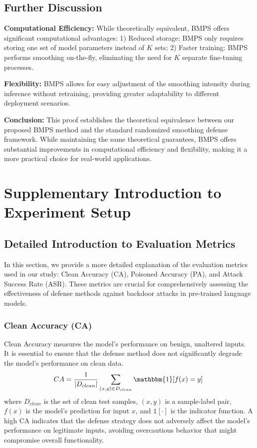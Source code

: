 \subsection{Further Discussion}
\textbf{Computational Efficiency:} While theoretically equivalent, BMPS offers significant computational advantages: 1) Reduced storage: BMPS only requires storing one set of model parameters instead of $K$ sets; 2) Faster training: BMPS performs smoothing on-the-fly, eliminating the need for $K$ separate fine-tuning processes.

\textbf{Flexibility:} BMPS allows for easy adjustment of the smoothing intensity during inference without retraining, providing greater adaptability to different deployment scenarios.

\textbf{Conclusion:} This proof establishes the theoretical equivalence between our proposed BMPS method and the standard randomized smoothing defense framework. While maintaining the same theoretical guarantees, BMPS offers substantial improvements in computational efficiency and flexibility, making it a more practical choice for real-world applications.


\section{Supplementary Introduction to Experiment Setup}
\label{appendix: supp experiment setup}
\subsection{Detailed Introduction to Evaluation Metrics}
In this section, we provide a more detailed explanation of the evaluation metrics used in our study: Clean Accuracy (CA), Poisoned Accuracy (PA), and Attack Success Rate (ASR). These metrics are crucial for comprehensively assessing the effectiveness of defense methods against backdoor attacks in pre-trained language models.

\subsubsection{Clean Accuracy (CA)}
Clean Accuracy measures the model's performance on benign, unaltered inputs. It is essential to ensure that the defense method does not significantly degrade the model's performance on clean data.
\begin{equation}
    CA = \frac{1}{|D_{clean}|} \sum_{(x,y) \in D_{clean}} \mathbbm{1}[f(x) = y]
\end{equation}
where $D_{clean}$ is the set of clean test samples, $(x,y)$ is a sample-label pair, $f(x)$ is the model's prediction for input $x$, and $\mathbb{1}[\cdot]$ is the indicator function.
A high CA indicates that the defense strategy does not adversely affect the model's performance on legitimate inputs, avoiding overcautious behavior that might compromise overall functionality.

